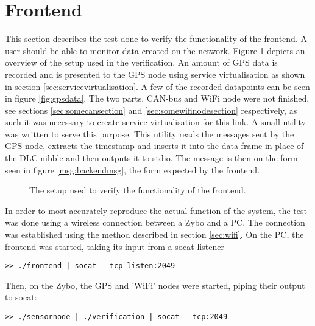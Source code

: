 
\section{Frontend}
This section describes the test done to verify the functionality of the frontend.
A user should be able to monitor data created on the network.
Figure \ref{fig:frontendsetup} depicts an overview of the setup used in the verification.
An amount of GPS data is recorded and is presented to the GPS node using service virtualisation as shown in section \ref{sec:servicevirtualisation}.
A few of the recorded datapoints can be seen in figure \ref{fig:gpsdata}.
The two parts, CAN-bus and WiFi node were not finished, see sections \ref{sec:somecansection} and \ref{sec:somewifinodesection} respectively, as such it was necessary to create service virtualisation for this link.
A small utility was written to serve this purpose.
This utility reads the messages sent by the GPS node, extracts the timestamp and inserts it into the data frame in place of the DLC nibble and then outputs it to stdio.
The message is then on the form seen in figure \ref{msg:backendmsg}, the form expected by the frontend.

\begin{figure}
	\caption{The setup used to verify the functionality of the frontend.}
	\label{fig:frontendsetup}
\end{figure}

In order to most accurately reproduce the actual function of the system, the test was done using a wireless connection between a Zybo and a PC.
The connection was established using the method described in section \ref{sec:wifi}.
On the PC, the frontend was started, taking its input from a socat listener
\begin{lstlisting}
>> ./frontend | socat - tcp-listen:2049
\end{lstlisting}
Then, on the Zybo, the GPS and 'WiFi' nodes were started, piping their output to socat:
\begin{lstlisting}
>> ./sensornode | ./verification | socat - tcp:2049
\end{lstlisting}
